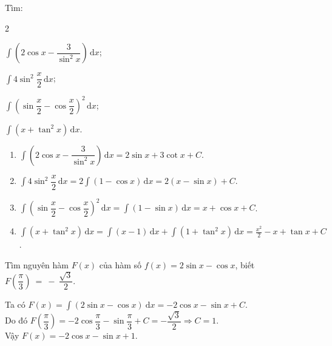 \documentclass[12pt,aspectratio=169]{beamer}
\begin{document}
\begin{baitap}%
	Tìm:
	\begin{enumEX}{2}
		\item $\displaystyle\int \left(2\cos x - \dfrac{3}{\sin^2 x}\right)\mathrm{\,d}x$;
		\item $\displaystyle\int 4\sin^2\dfrac{x}{2}\mathrm{\,d}x$;
		\item $\displaystyle\int \left(\sin \dfrac{x}{2} - \cos \dfrac{x}{2}\right)^2\mathrm{\,d}x$;
		\item $\displaystyle\int \left(x+\tan^2 x\right)\mathrm{\,d}x$.
	\end{enumEX}

	\begin{loigiai}
		\begin{enumerate}
			\item $\displaystyle\int \left(2\cos x - \dfrac{3}{\sin^2 x}\right)\mathrm{\,d}x = 2\sin x + 3\cot x + C$.

			\item $\displaystyle\int 4\sin^2\dfrac{x}{2}\mathrm{\,d}x = 2\int \left(1 - \cos x\right) \mathrm{\,d}x = 2\left(x - \sin x\right) + C$.

			\item $\displaystyle\int \left(\sin \dfrac{x}{2} - \cos \dfrac{x}{2}\right)^2\mathrm{\,d}x = \int \left(1-\sin x\right)\mathrm{\,d}x= x+\cos x + C$.

			\item $\displaystyle\int \left(x+\tan^2 x\right)\mathrm{\,d}x = \int (x-1)\mathrm{\,d}x + \int \left(1+\tan^2 x\right)\mathrm{\,d}x = \frac{x^2}{2} - x + \tan x + C$.
		\end{enumerate}
	\end{loigiai}
\end{baitap}

\begin{baitap}%
	Tìm nguyên hàm $F(x)$ của hàm số $f(x)=2\sin x-\cos x$, biết $F\left(\dfrac{\pi}{3}\right)~=~-~\dfrac{\sqrt{3}}{2}$.

	\begin{loigiai}
		Ta có
		$\displaystyle F(x)=\int (2\sin x-\cos x)\mathrm{~d}x=-2\cos x-\sin x+C$.\\
		Do đó
		$F\left(\dfrac{\pi}{3}\right)=-2\cos \dfrac{\pi}{3}-\sin \dfrac{\pi}{3}+C =-\dfrac{\sqrt{3}}{2}\Rightarrow C=1$.\\
		Vậy $F(x)=-2\cos x-\sin x+1$.
	\end{loigiai}
\end{baitap}
\end{document}
